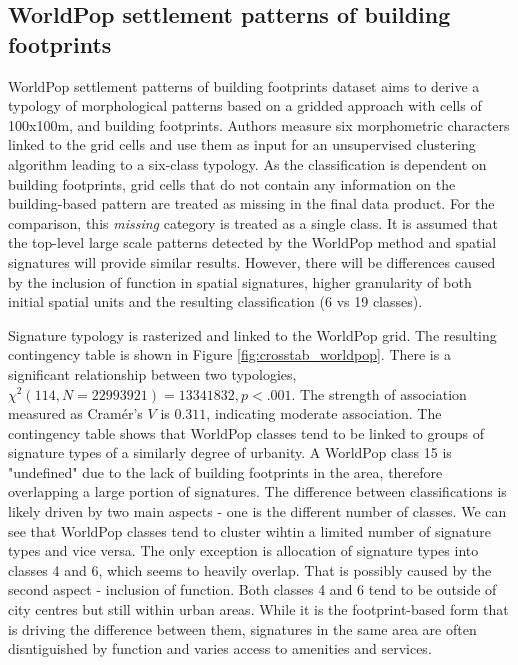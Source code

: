 \subsection*{WorldPop settlement patterns of building footprints}
WorldPop settlement patterns of building footprints dataset aims to derive a typology of
morphological patterns based on a gridded approach with cells of
100x100m, and building footprints. Authors measure six morphometric characters
linked to the grid cells and use them as input for an unsupervised clustering
algorithm leading to a six-class typology.
As the classification is dependent on building footprints, grid cells that do
not contain any information on the building-based pattern are treated as missing in the
final data product. For the comparison, this \textit{missing}
category is treated as a single class. It is assumed that the top-level large scale
patterns detected by the WorldPop method and spatial signatures will provide similar
results. However, there will be differences caused by the inclusion of function in spatial
signatures, higher granularity of both initial spatial units and the resulting
classification (6 vs 19 classes).

Signature typology is rasterized and linked to the WorldPop grid. The resulting
contingency table is shown in Figure \ref{fig:crosstab_worldpop}. There is a significant relationship between
two typologies, $\chi^{2} (114, N = 22993921) = 13341832, p < .001$. The strength of
association measured as Cram\'{e}r's $V$ is $0.311$, indicating moderate association.
The contingency table shows that WorldPop classes tend to be linked to groups of
signature types of a similarly degree of urbanity. A WorldPop class 15 is "undefined" due
to the lack of building footprints in the area, therefore overlapping a large portion of
signatures.
The difference between classifications is likely driven by two main aspects - one is the different
number of classes. We can see that WorldPop classes tend to cluster wihtin a limited number of
signature types and vice versa. The only exception is allocation of signature types into classes 4 and 6,
which seems to heavily overlap. That is possibly caused by the second aspect - inclusion of function. Both
classes 4 and 6 tend to be outside of city centres but still within urban areas. While it is
the footprint-based form that is driving the difference between them, signatures in the same
area are often disntiguished by function and varies access to amenities and services.

